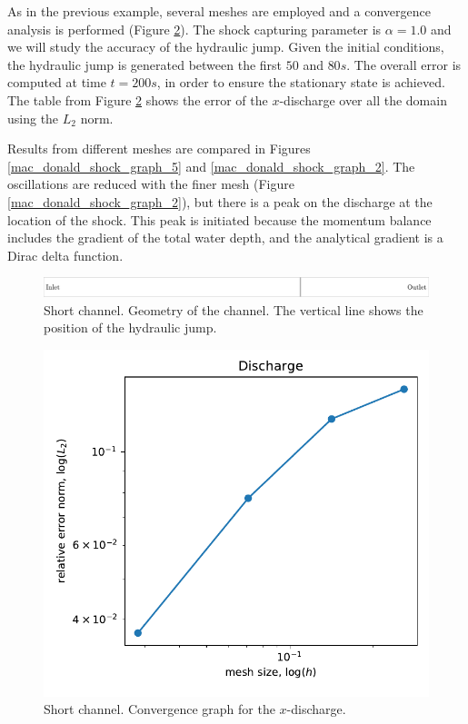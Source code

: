 As in the previous example, several meshes are employed and a convergence analysis is performed (Figure \ref{hydraulic_jump_convergence}). The shock capturing parameter is $\alpha=1.0$ and we will study the accuracy of the hydraulic jump. 
Given the initial conditions, the hydraulic jump is generated between the first $50$ and $80s$. The overall error is computed at time $t=200s$, in order to ensure the stationary state is achieved.
The table from Figure \ref{hydraulic_jump_convergence} shows the error of the $x$-discharge over all the domain using the $L_2$ norm.

Results from different meshes are compared in Figures \ref{mac_donald_shock_graph_5} and \ref{mac_donald_shock_graph_2}. The oscillations are reduced with the finer mesh (Figure \ref{mac_donald_shock_graph_2}), but there is a peak on the discharge at the location of the shock. This peak is initiated because the momentum balance includes the gradient of the total water depth, and the analytical gradient is a Dirac delta function.

\begin{figure} [ht]
    \includegraphics[width=\textwidth]{img/eulerian/jump/sketch.pdf}
    \caption{Short channel. Geometry of the channel. The vertical line shows the position of the hydraulic jump.}
    \label{chanel_geometry}
\end{figure}


\begin{figure} [htb]
    \centering
    \includegraphics[width=.8\textwidth]{img/eulerian/jump/momentum_convergence.pdf}
    \caption{Short channel. Convergence graph for the $x$-discharge.}
    \label{hydraulic_jump_convergence}
\end{figure}

